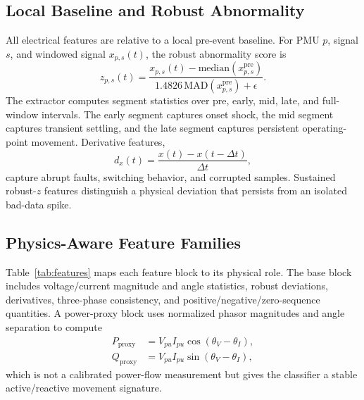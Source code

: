 \documentclass[conference]{IEEEtran}
\begin{document}
\subsection{Local Baseline and Robust Abnormality}
All electrical features are relative to a local pre-event baseline. For PMU $p$, signal $s$, and windowed signal $x_{p,s}(t)$, the robust abnormality score is
\begin{equation}
z_{p,s}(t)=
\frac{x_{p,s}(t)-\mathrm{median}(x_{p,s}^{\mathrm{pre}})}
{1.4826\,\mathrm{MAD}(x_{p,s}^{\mathrm{pre}})+\epsilon}.
\end{equation}
The extractor computes segment statistics over pre, early, mid, late, and full-window intervals. The early segment captures onset shock, the mid segment captures transient settling, and the late segment captures persistent operating-point movement. Derivative features,
\begin{equation}
d_x(t)=\frac{x(t)-x(t-\Delta t)}{\Delta t},
\end{equation}
capture abrupt faults, switching behavior, and corrupted samples. Sustained robust-$z$ features distinguish a physical deviation that persists from an isolated bad-data spike.

\subsection{Physics-Aware Feature Families}
Table~\ref{tab:features} maps each feature block to its physical role. The base block includes voltage/current magnitude and angle statistics, robust deviations, derivatives, three-phase consistency, and positive/negative/zero-sequence quantities. A power-proxy block uses normalized phasor magnitudes and angle separation to compute
\begin{equation}
\begin{aligned}
P_{\mathrm{proxy}}&=V_{pu}I_{pu}\cos(\theta_V-\theta_I),\\
Q_{\mathrm{proxy}}&=V_{pu}I_{pu}\sin(\theta_V-\theta_I),
\end{aligned}
\end{equation}
which is not a calibrated power-flow measurement but gives the classifier a stable active/reactive movement signature.
\end{document}
